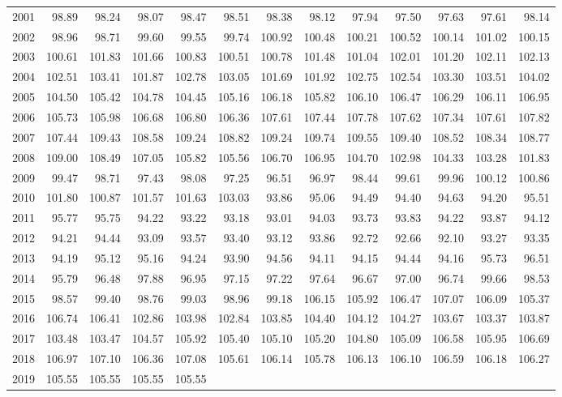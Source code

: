 \begin{longtable}{rrrrrrrrrrrrr}
  2001 & 98.89 & 98.24 & 98.07 & 98.47 & 98.51 & 98.38 & 98.12 & 97.94 & 97.50 & 97.63 & 97.61 & 98.14 \\ 
  2002 & 98.96 & 98.71 & 99.60 & 99.55 & 99.74 & 100.92 & 100.48 & 100.21 & 100.52 & 100.14 & 101.02 & 100.15 \\ 
  2003 & 100.61 & 101.83 & 101.66 & 100.83 & 100.51 & 100.78 & 101.48 & 101.04 & 102.01 & 101.20 & 102.11 & 102.13 \\ 
  2004 & 102.51 & 103.41 & 101.87 & 102.78 & 103.05 & 101.69 & 101.92 & 102.75 & 102.54 & 103.30 & 103.51 & 104.02 \\ 
  2005 & 104.50 & 105.42 & 104.78 & 104.45 & 105.16 & 106.18 & 105.82 & 106.10 & 106.47 & 106.29 & 106.11 & 106.95 \\ 
  2006 & 105.73 & 105.98 & 106.68 & 106.80 & 106.36 & 107.61 & 107.44 & 107.78 & 107.62 & 107.34 & 107.61 & 107.82 \\ 
  2007 & 107.44 & 109.43 & 108.58 & 109.24 & 108.82 & 109.24 & 109.74 & 109.55 & 109.40 & 108.52 & 108.34 & 108.77 \\ 
  2008 & 109.00 & 108.49 & 107.05 & 105.82 & 105.56 & 106.70 & 106.95 & 104.70 & 102.98 & 104.33 & 103.28 & 101.83 \\ 
  2009 & 99.47 & 98.71 & 97.43 & 98.08 & 97.25 & 96.51 & 96.97 & 98.44 & 99.61 & 99.96 & 100.12 & 100.86 \\ 
  2010 & 101.80 & 100.87 & 101.57 & 101.63 & 103.03 & 93.86 & 95.06 & 94.49 & 94.40 & 94.63 & 94.20 & 95.51 \\ 
  2011 & 95.77 & 95.75 & 94.22 & 93.22 & 93.18 & 93.01 & 94.03 & 93.73 & 93.83 & 94.22 & 93.87 & 94.12 \\ 
  2012 & 94.21 & 94.44 & 93.09 & 93.57 & 93.40 & 93.12 & 93.86 & 92.72 & 92.66 & 92.10 & 93.27 & 93.35 \\ 
  2013 & 94.19 & 95.12 & 95.16 & 94.24 & 93.90 & 94.56 & 94.11 & 94.15 & 94.44 & 94.16 & 95.73 & 96.51 \\ 
  2014 & 95.79 & 96.48 & 97.88 & 96.95 & 97.15 & 97.22 & 97.64 & 96.67 & 97.00 & 96.74 & 99.66 & 98.53 \\ 
  2015 & 98.57 & 99.40 & 98.76 & 99.03 & 98.96 & 99.18 & 106.15 & 105.92 & 106.47 & 107.07 & 106.09 & 105.37 \\ 
  2016 & 106.74 & 106.41 & 102.86 & 103.98 & 102.84 & 103.85 & 104.40 & 104.12 & 104.27 & 103.67 & 103.37 & 103.87 \\ 
  2017 & 103.48 & 103.47 & 104.57 & 105.92 & 105.40 & 105.10 & 105.20 & 104.80 & 105.09 & 106.58 & 105.95 & 106.69 \\ 
  2018 & 106.97 & 107.10 & 106.36 & 107.08 & 105.61 & 106.14 & 105.78 & 106.13 & 106.10 & 106.59 & 106.18 & 106.27 \\ 
  2019 & 105.55 & 105.55 & 105.55 & 105.55 &  &  &  &  &  &  &  &  \\ 
   \hline
\hline
\end{longtable}
